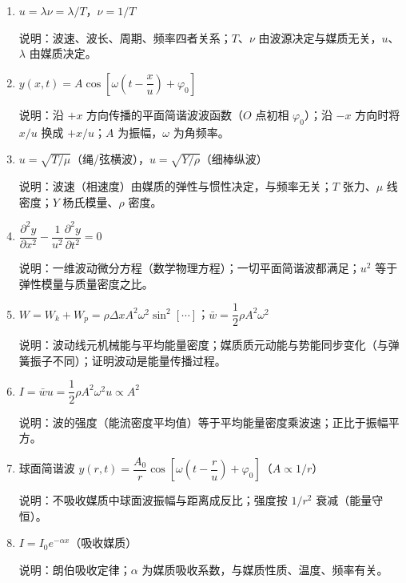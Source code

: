 \documentclass[12pt,a4paper]{ctexart}
\begin{document}
\begin{enumerate}[leftmargin=3em,label=\textbf{公式\arabic*}：,ref=公式\arabic*]

    \item $u = \lambda\nu = \lambda/T$，$\nu = 1/T$

    说明：波速、波长、周期、频率四者关系；$T$、$\nu$ 由波源决定与媒质无关，$u$、$\lambda$ 由媒质决定。

    \item $y(x,t) = A\cos\!\left[\omega\!\left(t-\dfrac{x}{u}\right)+\varphi_0\right]$

    说明：沿 $+x$ 方向传播的平面简谐波波函数（$O$ 点初相 $\varphi_0$）；沿 $-x$ 方向时将 $x/u$ 换成 $+x/u$；$A$ 为振幅，$\omega$ 为角频率。

    \item $u = \sqrt{T/\mu}$（绳/弦横波），$u = \sqrt{Y/\rho}$（细棒纵波）

    说明：波速（相速度）由媒质的弹性与惯性决定，与频率无关；$T$ 张力、$\mu$ 线密度；$Y$ 杨氏模量、$\rho$ 密度。

    \item $\dfrac{\partial^2 y}{\partial x^2} - \dfrac{1}{u^2}\dfrac{\partial^2 y}{\partial t^2} = 0$

    说明：一维波动微分方程（数学物理方程）；一切平面简谐波都满足；$u^2$ 等于弹性模量与质量密度之比。

    \item $W = W_k+W_p = \rho\Delta x A^2\omega^2\sin^2[\cdots]$；$\bar w = \dfrac{1}{2}\rho A^2\omega^2$

    说明：波动线元机械能与平均能量密度；媒质质元动能与势能同步变化（与弹簧振子不同）；证明波动是能量传播过程。

    \item $I = \bar wu = \dfrac{1}{2}\rho A^2\omega^2 u \propto A^2$

    说明：波的强度（能流密度平均值）等于平均能量密度乘波速；正比于振幅平方。

    \item 球面简谐波 $y(r,t) = \dfrac{A_0}{r}\cos\!\left[\omega\!\left(t-\dfrac{r}{u}\right)+\varphi_0\right]$（$A\propto 1/r$）

    说明：不吸收媒质中球面波振幅与距离成反比；强度按 $1/r^2$ 衰减（能量守恒）。

    \item $I = I_0 e^{-\alpha x}$（吸收媒质）

    说明：朗伯吸收定律；$\alpha$ 为媒质吸收系数，与媒质性质、温度、频率有关。


\end{enumerate}
\end{document}
